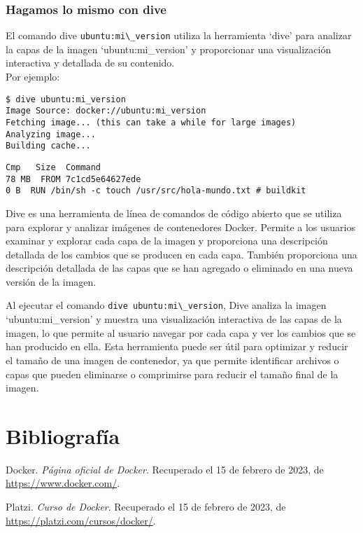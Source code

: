\documentclass{article}
\begin{document}
\subsubsection{Hagamos lo mismo con dive}
El comando dive \lstinline{ubuntu:mi\_version} utiliza la herramienta \enquote*{dive} para analizar la capas de la imagen \enquote*{ubuntu:mi\_version} y proporcionar una visualización interactiva y detallada de su contenido.\\
Por ejemplo:
\begin{lstlisting}[numbers=none]
$ dive ubuntu:mi_version
Image Source: docker://ubuntu:mi_version
Fetching image... (this can take a while for large images)
Analyzing image...
Building cache...      \end{lstlisting}

\begin{lstlisting}[numbers=none]
Cmp   Size  Command                                                          
78 MB  FROM 7c1cd5e64627ede    
0 B  RUN /bin/sh -c touch /usr/src/hola-mundo.txt # buildkit  
\end{lstlisting}
Dive es una herramienta de línea de comandos de código abierto que se utiliza para explorar y analizar imágenes de contenedores Docker. Permite a los usuarios examinar y explorar cada capa de la imagen y proporciona una descripción detallada de los cambios que se producen en cada capa. También proporciona una descripción detallada de las capas que se han agregado o eliminado en una nueva versión de la imagen.

Al ejecutar el comando \lstinline{dive ubuntu:mi\_version}, Dive analiza la imagen \enquote*{ubuntu:mi\_version} y muestra una visualización interactiva de las capas de la imagen, lo que permite al usuario navegar por cada capa y ver los cambios que se han producido en ella. Esta herramienta puede ser útil para optimizar y reducir el tamaño de una imagen de contenedor, ya que permite identificar archivos o capas que pueden eliminarse o comprimirse para reducir el tamaño final de la imagen.


\newpage
\section{Bibliografía}
\begin{thebibliography}{9}

      Docker. \textit{Página oficial de Docker}. Recuperado el 15 de febrero de 2023, de \url{https://www.docker.com/}.
      
      Platzi. \textit{Curso de Docker}. Recuperado el 15 de febrero de 2023, de \url{https://platzi.com/cursos/docker/}.
      
      \end{thebibliography}
\end{document}
